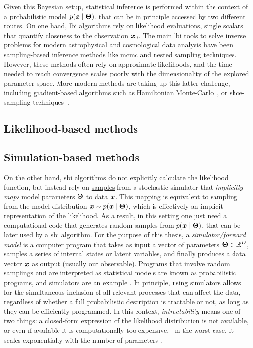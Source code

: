 Given this Bayesian setup, statistical inference is performed within the context of a probabilistic model $p(\bm{x}\mid\bm{\Theta})$, that can be in principle accessed by two different routes. On one hand, \gls*{lbi} algorithms rely on likelihood \underline{evaluations}, single scalars that quantify closeness to the observation $\bm{x}_0$. The main \gls*{lbi} tools to solve inverse problems for modern astrophysical and cosmological data analysis have been sampling-based inference methods like \gls*{mcmc} \citep{Metropolis:1953am, Hastings:1970aa} and nested sampling \citep{Skilling:2006gxv, Feroz:2008xx, Handley:2015fda} techniques. However, these methods often rely on approximate likelihoods, and the time needed to reach convergence scales poorly with the dimensionality of the explored parameter space. More modern methods are taking up this latter challenge, including gradient-based algorithms such as Hamiltonian Monte-Carlo~\citep{Duane:1987de}, or slice-sampling techniques~\citep{Neal:aa, Handley:2015fda}.

\subsection{Likelihood-based methods}

\subsection{Simulation-based methods}

On the other hand, \gls*{sbi} algorithms do not explicitly calculate the likelihood function, but instead rely on \underline{samples} from a stochastic simulator that  \emph{implicitly maps} model parameters $\bm{\Theta}$ to data $\bm{x}$. This mapping is equivalent to sampling from the model distribution $\bm{x} \sim p(\bm{x}\mid\bm{\Theta})$, which is effectively an implicit representation of the likelihood. As a result, in this setting one just need a computational code that generates random samples from $p(\bm{x}\mid\bm{\Theta})$, that can be later used by a \gls*{sbi} algorithm. For the purpose of this thesis, a \emph{simulator/forward model} is a computer program that takes as input a vector of parameters $\bm{\Theta} \in \mathbb{R}^D$, samples a series of internal states or latent variables, and finally produces a data vector  $\bm{x}$  as output (usually our observable). Programs that involve random samplings and are interpreted as statistical models are known as probabilistic programs, and simulators are an example \cite{Cranmer:2019eaq}. In principle, using simulators allows for the simultaneous inclusion of all relevant processes that can affect the data, regardless of whether a full probabilistic description is tractable or not, as long as they can be efficiently programmed. In this context, \emph{intractability} means one of two things: a closed-form expression of the likelihood distribution is not available, or even if available it is computationally too expensive, \eg\, in the worst case, it scales exponentially with the number of parameters \cite{Leclercq:2018who, Mootoovaloo:2020ott}.

